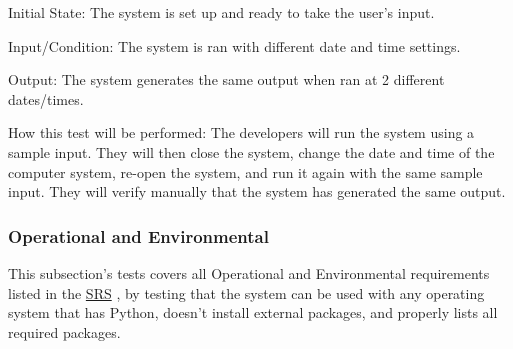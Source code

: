 \documentclass[12pt, titlepage]{article}
\begin{document}
\begin{enumerate}
Initial State: 
The system is set up and ready to take the user's input.

Input/Condition: 
The system is ran with different date and time settings.

Output: 
The system generates the same output when ran at 2 different dates/times.

How this test will be performed: The developers will run the system using a sample input. They will then close the system, change the date and time of the computer system, re-open the system, and run it again with the same sample input. They will verify manually that the system has generated the same output.

\end{enumerate}

\subsubsection{Operational and Environmental}
This subsection's tests covers all Operational and Environmental requirements listed in the \href{https://github.com/paezha/PyERT-BLACK/blob/main/docs/SRS/SRS.pdf}{SRS} \citep{SRS}, by testing that the system can be used with any operating system that has Python, doesn't install external packages, and properly lists all required packages. 
\end{document}
